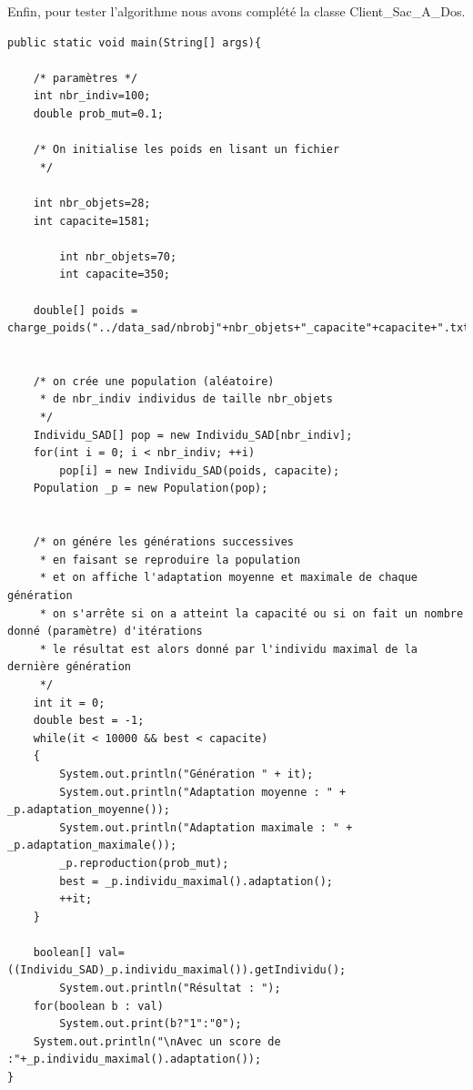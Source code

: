 \documentclass{article}
\begin{document}
Enfin, pour tester l'algorithme nous avons complété la classe Client_Sac_A_Dos.
\begin{verbatim}
public static void main(String[] args){
	
	/* paramètres */ 
	int nbr_indiv=100;
	double prob_mut=0.1;
	
	/* On initialise les poids en lisant un fichier 
	 */
	
	int nbr_objets=28;
	int capacite=1581;
	
		int nbr_objets=70;
		int capacite=350;		
	
	double[] poids = charge_poids("../data_sad/nbrobj"+nbr_objets+"_capacite"+capacite+".txt",nbr_objets);
	
	
	/* on crée une population (aléatoire)
	 * de nbr_indiv individus de taille nbr_objets
	 */
	Individu_SAD[] pop = new Individu_SAD[nbr_indiv];
	for(int i = 0; i < nbr_indiv; ++i)
		pop[i] = new Individu_SAD(poids, capacite);
	Population _p = new Population(pop);

	
	/* on génére les générations successives
	 * en faisant se reproduire la population
	 * et on affiche l'adaptation moyenne et maximale de chaque génération
	 * on s'arrête si on a atteint la capacité ou si on fait un nombre donné (paramètre) d'itérations
	 * le résultat est alors donné par l'individu maximal de la dernière génération
	 */
	int it = 0;
	double best = -1;
	while(it < 10000 && best < capacite)
	{
		System.out.println("Génération " + it);
		System.out.println("Adaptation moyenne : " + _p.adaptation_moyenne());
		System.out.println("Adaptation maximale : " + _p.adaptation_maximale());
		_p.reproduction(prob_mut);
		best = _p.individu_maximal().adaptation();
		++it;
	}
	
	boolean[] val= ((Individu_SAD)_p.individu_maximal()).getIndividu();
		System.out.println("Résultat : ");
	for(boolean b : val)
		System.out.print(b?"1":"0");
	System.out.println("\nAvec un score de :"+_p.individu_maximal().adaptation());
}
\end{verbatim}
\end{document}
